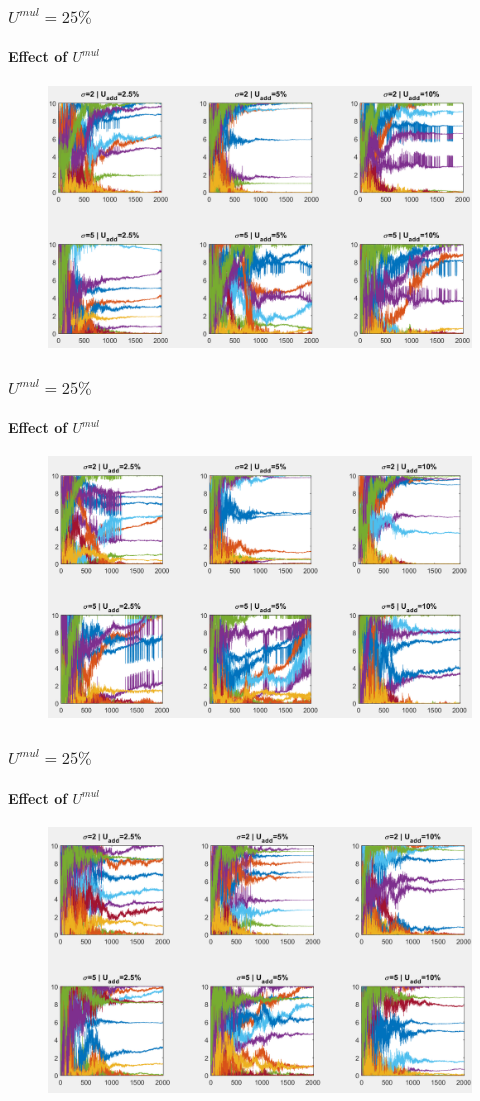 \documentclass[fleqn]{beamer}
\begin{document}
\begin{frame}
	\frametitle{$U^{mul}=25\% $}
	\framesubtitle{Effect of $U^{mul}$}
	\begin{figure}
		\centering
		\includegraphics[width=4.5in]{figures/results_figures/Umul/knobs_Umul_25_lambda_11.png}
	\end{figure}
\end{frame}

\begin{frame}
	\frametitle{$U^{mul}=25\%$}
	\framesubtitle{Effect of $U^{mul}$}
	\begin{figure}
		\centering
		\includegraphics[width=4.5in]{figures/results_figures/Umul/knobs_Umul_50_lambda_11.png}
	\end{figure}
\end{frame}

\begin{frame}
	\frametitle{$U^{mul}=25\%$}
	\framesubtitle{Effect of $U^{mul}$}
	\begin{figure}
		\centering
		\includegraphics[width=4.5in]{figures/results_figures/Umul/knobs_Umul_75_lambda_11.png}
	\end{figure}
\end{frame}
\end{document}
